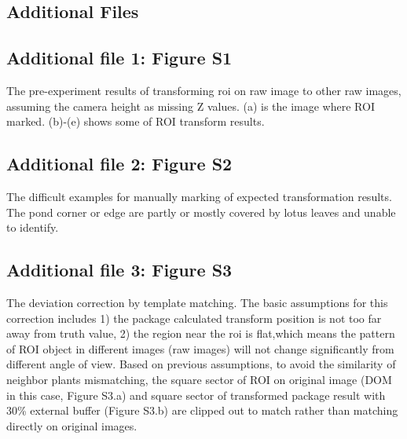 \documentclass{configs/bmcart}
\begin{document}
\begin{backmatter}




\section*{Additional Files}
\subsection*{Additional file 1: Figure S1}
The pre-experiment results of transforming \acrfull*{roi} on raw image to other raw images, assuming the camera height as missing Z values. (a) is the image where ROI marked. (b)-(e) shows some of ROI transform results. 

\subsection*{Additional file 2: Figure S2}
The difficult examples for manually marking of expected transformation results. The pond corner or edge are partly or mostly covered by lotus leaves and unable to identify.

\subsection*{Additional file 3: Figure S3}
The deviation correction by template matching. The basic assumptions for this correction includes 1) the package calculated transform position is not too far away from truth value, 2) the region near the \acrfull*{roi} is flat,which means the pattern of ROI object in different images (raw images) will not change significantly from different angle of view. Based on previous assumptions, to avoid the similarity of neighbor plants mismatching, the square sector of ROI on original image (DOM in this case, Figure S3.a) and square sector of transformed package result with 30\% external buffer (Figure S3.b) are clipped out to match rather than matching directly on original images. 


\end{backmatter}
\end{document}
